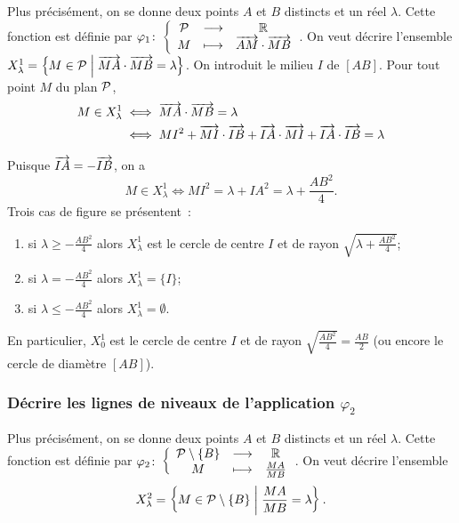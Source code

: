 Plus précisément, on se  donne deux points \(A\) et \(B\) distincts et
un réel \(\lambda\). Cette fonction est définie par
\(\fonction{\varphi_1}{\P}{\R}{M}{\vect{AM} \cdot \vect{MB}}\). On veut
décrire l'ensemble \(X_{\lambda}^{1} = \enstq{M \in \P}{\vect{MA} \cdot
\vect{MB} = \lambda}\). On introduit le milieu \(I\) de \([AB]\). Pour
tout point \(M\) du plan \(\P\),
\begin{align}
  M \in X_{\lambda}^{1} & \iff \vect{MA} \cdot \vect{MB} = \lambda \\
                        & \iff MI^2 + \vect{MI} \cdot \vect{IB} +
                        \vect{IA} \cdot \vect{MI} + \vect{IA} \cdot
                        \vect{IB} = \lambda
\end{align}

Puisque \(\vect{IA} = -\vect{IB}\), on a
\begin{equation}
  M \in X_{\lambda}^{1}  \iff MI^2 = \lambda + IA^2 = \lambda +
  \frac{AB^2}{4}.
\end{equation}
Trois cas de figure se présentent~:
\begin{enumerate}
  \item si \(\lambda \geqslant -\frac{AB^2}{4}\) alors
    \(X_{\lambda}^{1}\) est le cercle de centre \(I\) et de rayon
    \(\sqrt{\lambda +\frac{AB^2}{4}}\);
  \item si \(\lambda = -\frac{AB^2}{4}\) alors \(X_{\lambda}^{1} =
    \{I\}\);
  \item si \(\lambda \leqslant -\frac{AB^2}{4}\) alors
    \(X_{\lambda}^{1} = \emptyset\).
\end{enumerate}
En particulier, \(X_{0}^{1}\) est le cercle de centre \(I\) et de
rayon \(\sqrt{\frac{AB^2}{4}} = \frac{AB}{2}\) (ou encore le cercle de
diamètre \([AB]\)).

\subsubsection{Décrire les lignes de niveaux de l'application
\(\varphi_2\)}

Plus précisément, on se donne deux points \(A\) et \(B\) distincts et
un réel \(\lambda\). Cette fonction est définie par
\(\fonction{\varphi_2}{\P\setminus\{B\}}{\R}{M}{\frac{MA}{MB}}\). On
veut décrire l'ensemble
\begin{equation}
  X_{\lambda}^2 = \enstq{M \in \P\setminus\{B\}}{\frac{MA}{MB} =
  \lambda}.
\end{equation}

